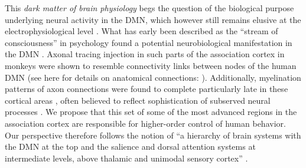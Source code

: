 \documentclass[10pt,letterpaper]{article}
\begin{document}
This \textit{dark matter of brain physiology}
\citep{raichle2006brain} begs the question
of the biological purpose underlying neural activity in the DMN,
which however still remains elusive at the electrophysiological level
\citep{de2010temporal,brookes2011investigating,baker2014fast}.
What has early been described as the ``stream of consciousness''
in psychology \citep{james1890principles}
found a potential neurobiological manifestation
in the DMN
\citep{shul1997, raichle2001pnas}.
%
Axonal tracing injection in such parts of the association cortex in monkeys
were shown to resemble connectivity links between nodes of the human
DMN (see here for details on anatomical connections: \citep{randy2008}).
Additionally, myelination patterns of axon connections were found to complete
particularly late in these cortical areas \citep{flechsig1920}, often believed to reflect
sophistication of subserved neural processes
\citep{Sowell2003, Yakovlev1967}.
%
We propose that this set of some of the most advanced regions in
the association cortex \citep{mesulam1998sensation, margulies2016situating}
are responsible for higher-order control of human behavior.
Our perspective therefore follows the notion of
``a hierarchy of brain systems with
the DMN at the top and the salience and dorsal attention systems
at intermediate levels, above thalamic and unimodal sensory
cortex'' \citep{carhart2010default}.
\end{document}
